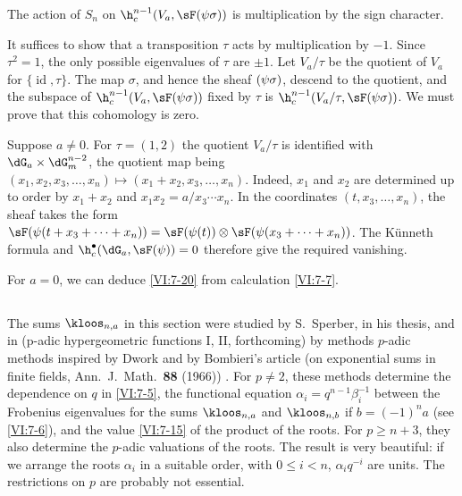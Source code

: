\begin{proposition_}\label{VI:7-20}
The action of $S_n$ on $\h_c^{n-1}(V_a,\sF(\psi\sigma))$ is multiplication 
by the sign character. 
\end{proposition_}

It suffices to show that a transposition $\tau$ acts by multiplication 
by $-1$. Since $\tau^2=1$, the only possible eigenvalues of $\tau$ are 
$\pm 1$. Let $V_a/\tau$ be the quotient of $V_a$ for 
$\{\operatorname{id},\tau\}$. The map $\sigma$, and hence the sheaf 
$\sf(\psi\sigma)$, descend to the quotient, and the subspace of 
  $\h_c^{n-1}(V_a,\sF(\psi\sigma))$ fixed by 
$\tau$ is $\h_c^{n-1}(V_a/\tau,\sF(\psi\sigma))$. We must prove that 
this cohomology is zero. 

Suppose $a\ne 0$. For $\tau=(1,2)$ the quotient $V_a/\tau$ is identified 
with $\dG_a\times \dG_m^{n-2}$, the quotient map being 
$(x_1,x_2,x_3,\dots,x_n)\mapsto (x_1+x_2,x_3,\dots,x_n)$. Indeed, $x_1$ and 
$x_2$ are determined 
up to order by $x_1+x_2$ and 
$x_1x_2 = a/x_3\dotsm x_n$. In the coordinates $(t,x_3,\dots,x_n)$, the 
sheaf takes the form 
$\sF(\psi(t+x_3+\cdots + x_n)) = \sF(\psi(t))\otimes \sF(\psi(x_3+\cdots + x_n))$. 
  The K\"unneth formula and $\h_c^\bullet(\dG_a,\sF(\psi)) = 0$ therefore give 
the required vanishing. 

For $a=0$, we can deduce \ref{VI:7-20} from calculation \ref{VI:7-7}. 





\subsection{}\label{VI:7-21}

The sums $\kloos_{n,a}$ in this section were studied by 
S.\ Sperber, in his thesis, and in (p-adic hypergeometric functions I, II, forthcoming) \cite{sp77} by methods 
$p$-adic methods inspired by Dwork and by Bombieri's article (on exponential sums in finite fields, Ann.~J.~Math.~\textbf{88} (1966)) \cite{bo66}. 
For $p\ne 2$, these methods determine the dependence on $q$ in \ref{VI:7-5}, 
the functional equation $\alpha_i = q^{n-1} \beta_i^{-1}$ between the 
Frobenius eigenvalues for the sums $\kloos_{n,a}$ and 
$\kloos_{n,b}$ if $b=(-1)^n a$ (see \ref{VI:7-6}), and the value \ref{VI:7-15} 
of the product of the roots. For $p\geqslant n+3$, they also determine the 
$p$-adic valuations of the roots. The result is very beautiful: if we arrange 
the roots $\alpha_i$ in a suitable order, with 
  $0\leqslant i<n$, $\alpha_i q^{-i}$ are units. The 
restrictions on $p$ are probably not essential. 










